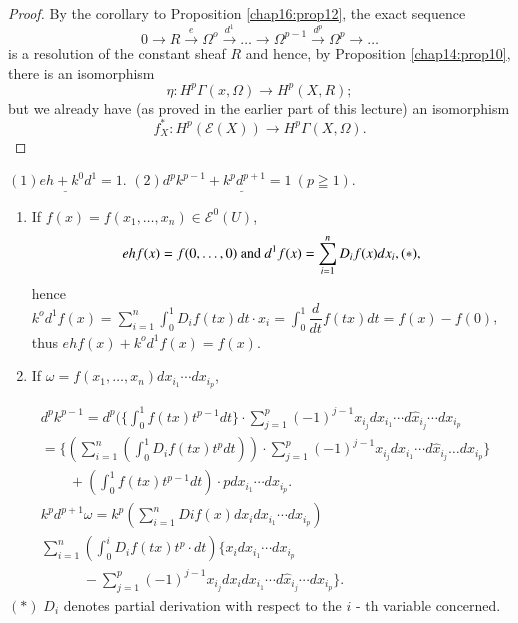 \begin{proof}
By the corollary to Proposition \ref{chap16:prop12}, the exact sequence
$$
0 \rightarrow R \xrightarrow{e} \Omega^o \xrightarrow{d^1} \dots
\rightarrow \Omega^{p-1} \xrightarrow{d^p} \Omega^p \rightarrow \dots 
$$
is a resolution of the constant sheaf $R$ and hence, by Proposition
\ref{chap14:prop10}, there is an isomorphism 
$$
\eta : H^p \Gamma ( x, \Omega )  \rightarrow H^p ( X,R ); 
$$
 but we already have (as proved in the earlier part of this lecture)
 an isomorphism 
 $$
 f^*_X : H^p ( \mathscr{E} (X) ) \rightarrow H^p \Gamma ( X, \Omega
 ). 
 $$
\end{proof}

\noindent
$ \underline{(1) eh + k^0 d^1 = 1 } $.  \quad $ \underline{(2) d^p
  k^{p-1} + k^p d^{p+1} = 1 ~ ( p \geqq 1)} $.\pageoriginale 

\begin{enumerate}[(1)]
\item  If $ f (x) = f ( x_1, \ldots , x_n )  \in \mathscr{E}^0 (U ) $, 
$$  
eh f (x) = f( 0, \ldots , 0 ) \text{ and }  d^1 f(x) = \sum^n_{i =1}
D_i f (x)  dx_i,  \hfill{(*)},  
$$ 
 hence $ k^o d^1 f(x) = \sum^n_{i=1}  \int^1_0 D_i f (tx) dt \cdot  x_i =
 \int^1_0 \dfrac{d}{dt} f (tx) dt  = f (x) - f(0)$, thus $eh f (x) +
 k^o d^1 f(x) = f (x) $. 

\item If $ \omega = f ( x_1, \ldots , x_n ) dx_{i_1} \cdots dx_{i_{p}}$,
\end{enumerate}
\begin{align*}
 & d^p k^{p-1} = d^p ( \bigg\{ \int^1_0  f (tx) t^{p-1} dt \bigg\}
  \cdot \sum^p_{j=1} (-1)^{j-1} x_{i_{j}} dx_{i_{1}} \cdots d
  \hat{x}_{i_{j}} \cdots dx_{i_{p}}\\ 
 &  = \bigg\{ ( \sum^n_{i=1} ( \int^1_0 D_i f (tx) t^p dt ) ) \cdot
  \sum^p_{j=1} (-1)^{j-1} x_{i_{j}} dx_{i_{1}} \cdots d
  \hat{x}_{i_{j}} \dots dx_{i_{p}} \bigg\}\\ 
 & \qquad + ( \int^1_0 f (tx) t^{p-1} dt ) \cdot  p dx_{i_{1}} \cdots
  dx_{i_{p}}.\\ 
 & k^p d^{p+1} \omega = k^p ( \sum^n_{i=1} Di f (x)  dx_i
  dx_{i_{1}} \cdots dx_{i_{p}})\\  
& \sum^n_{i=1}  ( \int^i_0 D_i f (tx) t^p \cdot dt ) \bigg\{ x_i dx_{i_{1}}
  \cdots dx_{i_{p}}\\
&\qquad\quad{} - \sum^p_{j=1} (-1)^{j-1} x_{i_{j}} dx_i
  dx_{i_{1}} \cdots d \hat{x}_{i_{j}} \cdots dx_{i_{p}} \bigg\}. 
\end{align*}
$ (*) \; D_i $ denotes partial derivation with respect to the $i$ - th
variable concerned.  

